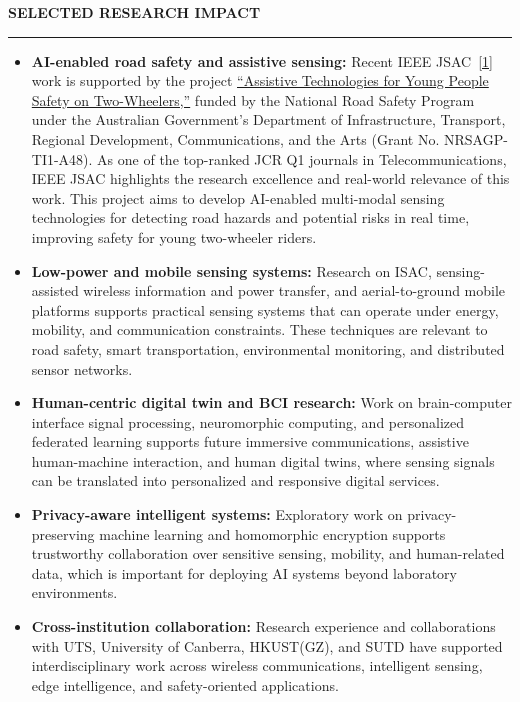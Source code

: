 \documentclass[10pt,a4paper]{article}
\newcommand{\sectionrule}[1]{
  \vspace{0.55em}
  {\large\bfseries #1\par}
  \vspace{0.20em}
  \hrule
  \vspace{0.45em}
}
\begin{document}
\sectionrule{SELECTED RESEARCH IMPACT}
\begin{itemize}
  \item \textbf{AI-enabled road safety and assistive sensing:} Recent IEEE JSAC~\hyperlink{pub:jsac}{[1]} work is supported by the project \href{https://researchprofiles.canberra.edu.au/en/projects/assistive-technologies-for-young-people-safety-on-two-wheelers/}{``Assistive Technologies for Young People Safety on Two-Wheelers,''} funded by the National Road Safety Program under the Australian Government's Department of Infrastructure, Transport, Regional Development, Communications, and the Arts (Grant No. NRSAGP-TI1-A48). As one of the top-ranked JCR Q1 journals in Telecommunications, IEEE JSAC highlights the research excellence and real-world relevance of this work. This project aims to develop AI-enabled multi-modal sensing technologies for detecting road hazards and potential risks in real time, improving safety for young two-wheeler riders.
  \item \textbf{Low-power and mobile sensing systems:} Research on ISAC, sensing-assisted wireless information and power transfer, and aerial-to-ground mobile platforms supports practical sensing systems that can operate under energy, mobility, and communication constraints. These techniques are relevant to road safety, smart transportation, environmental monitoring, and distributed sensor networks.
  \item \textbf{Human-centric digital twin and BCI research:} Work on brain-computer interface signal processing, neuromorphic computing, and personalized federated learning supports future immersive communications, assistive human-machine interaction, and human digital twins, where sensing signals can be translated into personalized and responsive digital services.
  \item \textbf{Privacy-aware intelligent systems:} Exploratory work on privacy-preserving machine learning and homomorphic encryption supports trustworthy collaboration over sensitive sensing, mobility, and human-related data, which is important for deploying AI systems beyond laboratory environments.
  \item \textbf{Cross-institution collaboration:} Research experience and collaborations with UTS, University of Canberra, HKUST(GZ), and SUTD have supported interdisciplinary work across wireless communications, intelligent sensing, edge intelligence, and safety-oriented applications.
\end{itemize}
\end{document}
